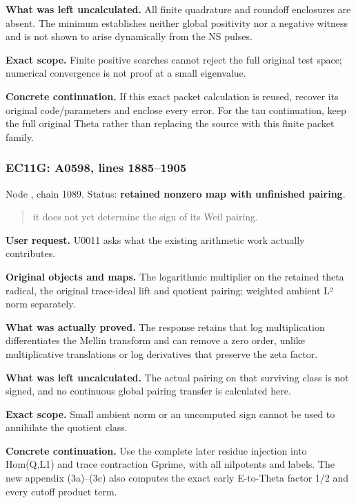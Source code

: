 \documentclass[10pt,a4paper,oneside]{report}
\begin{document}
\textbf{What was left uncalculated.} All finite quadrature and roundoff
enclosures are absent. The minimum establishes neither global positivity
nor a negative witness and is not shown to arise dynamically from the NS
pulses.

\textbf{Exact scope.} Finite positive searches cannot reject the full
original test space; numerical convergence is not proof at a small
eigenvalue.

\textbf{Concrete continuation.} If this exact packet calculation is
reused, recover its original code/parameters and enclose every error.
For the tau continuation, keep the full original Theta rather than
replacing the source with this finite packet family.

\subsubsection{EC11G: A0598, lines
1885--1905}\label{ec11g-a0598-lines-18851905}

Node \protect{}, chain 1089.
Status: \textbf{retained nonzero map with unfinished pairing}.

\begin{quote}
it does not yet determine the sign of its Weil pairing.
\end{quote}

\textbf{User request.} U0011 asks what the existing arithmetic work
actually contributes.

\textbf{Original objects and maps.} The logarithmic multiplier on the
retained theta radical, the original trace-ideal lift and quotient
pairing; weighted ambient L² norm separately.

\textbf{What was actually proved.} The response retains that log
multiplication differentiates the Mellin transform and can remove a zero
order, unlike multiplicative translations or log derivatives that
preserve the zeta factor.

\textbf{What was left uncalculated.} The actual pairing on that
surviving class is not signed, and no continuous global pairing transfer
is calculated here.

\textbf{Exact scope.} Small ambient norm or an uncomputed sign cannot be
used to annihilate the quotient class.

\textbf{Concrete continuation.} Use the complete later residue injection
into Hom(Q,L1) and trace contraction Gprime, with all nilpotents and
labels. The new appendix (3a)--(3c) also computes the exact early
E-to-Theta factor 1/2 and every cutoff product term.
\end{document}
